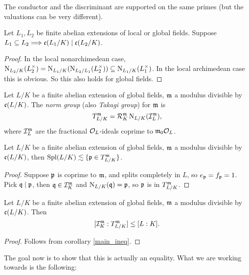 \documentclass[11pt]{amsart}
\begin{document}
\begin{Rem}
    The conductor and the discriminant are supported on the same primes (but the valuations can be very different).
\end{Rem}

\begin{lem}
    Let $L_1,L_2$ be finite abelian extensions of local or global fields. Suppose $L_1\subseteq L_2 \Longrightarrow \mathfrak{c}(L_1/K) \mid \mathfrak{c}(L_2/K)$.
\end{lem}

\begin{proof}
    In the local nonarchimedean case, $\operatorname{N}_{L_2/K}(L_2^\times) = \operatorname{N}_{L_1/K}(\operatorname{N}_{L_2/L_1}(L_2^\times)) \subseteq \operatorname{N}_{L_1/K}(L_1^\times)$. In the local archimedean case this is obvious. So this also holds for global fields.
\end{proof}


\begin{defn}
    Let $L/K$ be a finite abelian extension of global fields, $\mathfrak{m}$ a modulus divisible by $\mathfrak{c}(L/K)$. The \emph{norm group} (also \emph{Takagi group}) for $\mathfrak{m}$ is
    \[T_{L/K}^{\mathfrak{m}} = \mathcal{R}_K^{\mathfrak{m}} \operatorname{N}_{L/K}(\mathcal{I}_L^{\mathfrak{m}}),\]
    where $\mathcal{I}_L^{\mathfrak{m}}$ are the fractional $\mathcal{O}_L$-ideals coprime to $\mathfrak{m}_0\mathcal{O}_L$. 
\end{defn}

\begin{prop}
    Let $L/K$ be a finite abelian extension of global fields, $\mathfrak{m}$ a modulus divisible by $\mathfrak{c}(L/K)$, then $\operatorname{Spl}(L/K)\lesssim \{\mathfrak{p}\in T_{L/K}^{\mathfrak{m}}\}$.
\end{prop}

\begin{proof}
    Suppose $\mathfrak{p}$ is coprime to $\mathfrak{m}$, and splits completely in $L$, so $e_{\mathfrak{p}} = f_{\mathfrak{p}} = 1$. Pick $\mathfrak{q}\mid\mathfrak{p}$, then $\mathfrak{q} \in \mathcal{I}_K^{\mathfrak{m}}$ and $\operatorname{N}_{L/K}(\mathfrak{q}) = \mathfrak{p}$, so $\mathfrak{p}$ is in $T_{L/K}^{\mathfrak{m}}$.
\end{proof}

\begin{thm}
\label{2ndMainIneq}
    Let $L/K$ be a finite abelian extension of global fields, $\mathfrak{m}$ a modulus divisible by $\mathfrak{c}(L/K)$. Then
    \[[\mathcal{I}_K^{\mathfrak{m}}: T_{L/K}^{\mathfrak{m}}] \le [L:K].\]
\end{thm}

\begin{proof}
    Follows from corollary \ref{main_ineq}.
\end{proof}

The goal now is to show that this is actually an equality. What we are working towards is the following:
\end{document}

